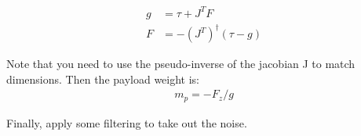 \documentclass[11pt]{article}
\newcommand{\mat}[1]{\ensuremath{\begin{bmatrix}#1\end{bmatrix}}}	%
\begin{document}
\begin{align*}
g &= \tau  + J^TF \\
F &= -(J^T)^\dagger (\tau - g) 
\end{align*}

Note that you need to use the pseudo-inverse of the jacobian J to match dimensions.  Then the payload weight is:
\begin{align*}
m_p = -F_z / g 
\end{align*}

Finally, apply some filtering to take out the noise. 


%
%
%
%
%
%
%
\end{document}
